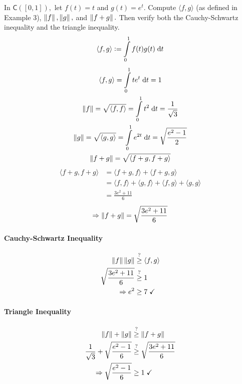 In $\mathsf{C}([0,1]),$ let $f(t) = t$ and $g(t) = e^t.$ Compute
$\langle f,g \rangle$ (as defined in Example 3), $\left\lVert f\right\rVert,\left\lVert g\right\rVert,$
and $\left\lVert f+g\right\rVert.$ Then verify both the Cauchy-Schwartz inequality and
the triangle inequality.
\begin{equation}
\langle f,g \rangle \vcentcolon = \int\limits_0^1 f(t)g(t) \; \mathrm{d}t
\end{equation}
\begin{gather}
\langle f,g\rangle = \int\limits_0^1 te^t \; \mathrm{d}t = 1\\
\left\lVert f\right\rVert = \sqrt{\langle f,f \rangle} = \int\limits_0^1 t^2\;
\mathrm{d}t = \frac{1}{\sqrt{3}}\\
\left\lVert g\right\rVert = \sqrt{\langle g,g\rangle} = \int\limits_0^1 e^{2t} \;
\mathrm{d}t = \sqrt{\frac{e^2 -1}{2}}\\
\left\lVert f+g\right\rVert = \sqrt{\langle f+g,f+g \rangle}
\end{gather}
\begin{align}
\langle f+g,f+g \rangle &= \langle f+g,f\rangle + \langle f+g,g\rangle\\
&=\langle  f,f \rangle + \langle g,f \rangle + \langle f,g \rangle +
\langle g,g\rangle\\
&= \frac{3e^2 + 11}{6}
\end{align}
\begin{equation}
\Rightarrow \left\lVert f+g\right\rVert = \sqrt{\frac{3e^2 + 11}{6}}
\end{equation}
\paragraph{Cauchy-Schwartz Inequality}
\begin{align}
\left\lVert f\right\rVert\left\lVert g\right\rVert &\stackrel{?}{\geq} \langle f,g \rangle \\
\sqrt{\frac{3e^2 + 11}{6}} &\stackrel{?}{\geq} 1\\
\Rightarrow e^2 &\geq 7 \; \checkmark
\end{align}
\paragraph{Triangle Inequality}
\begin{align}
\left\lVert f\right\rVert + \left\lVert g\right\rVert &\stackrel{?}{\geq} \left\lVert f+g\right\rVert\\
\frac{1}{\sqrt{3}} + \sqrt{\frac{e^2-1}{6}} &\stackrel{?}{\geq}
\sqrt{\frac{3e^2 +11}{6}}\\
\Rightarrow \sqrt{\frac{e^2-1}{6}} &\geq 1 \; \checkmark
\end{align}
